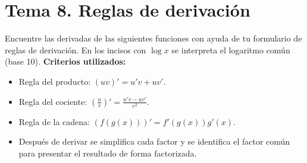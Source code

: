 \documentclass[12pt, letterpaper]{article}
\begin{document}

\newpage
\section{Tema 8. Reglas de derivación}

Encuentre las derivadas de las siguientes funciones con ayuda de tu formulario de reglas de derivación. En los incisos con $\log x$ se interpreta el logaritmo común (base 10).
\textbf{Criterios utilizados:}
\begin{itemize}
  \item Regla del producto: $(uv)'=u'v+uv'$.
  \item Regla del cociente: $\left(\frac uv\right)'=\frac{u'v-uv'}{v^2}$.
  \item Regla de la cadena: $(f(g(x)))'=f'(g(x))g'(x)$.
  \item Después de derivar se simplifica cada factor y se identifica el factor común para presentar el resultado de forma factorizada.
\end{itemize}
\end{document}
